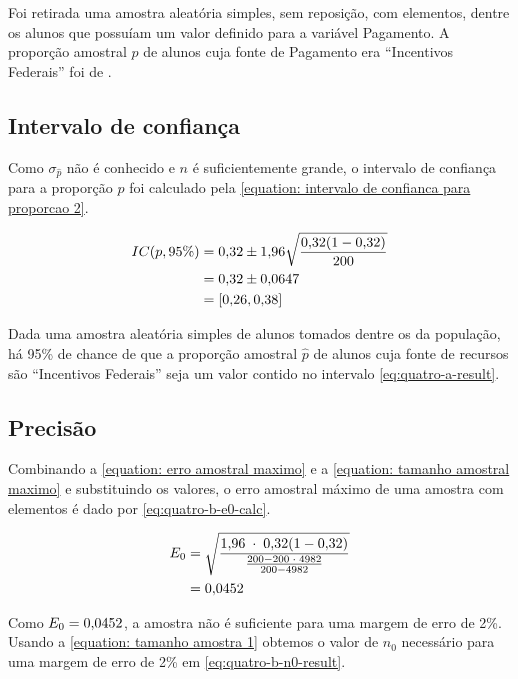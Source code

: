 

	Foi retirada uma amostra aleatória simples, sem reposição, com \QUATROn
	elementos, dentre os \QUATRON alunos que possuíam um valor definido para a
	variável Pagamento. A proporção amostral $\hat{p}$ de alunos cuja fonte de
	Pagamento era ``Incentivos Federais'' foi de \QUATROpAmostral.

\subsection{Intervalo de confiança}

	Como $\sigma_{\hat{p}}$ não é conhecido e $n$ é suficientemente grande,
	o intervalo de confiança para a proporção $p$ foi calculado pela
	\autoref{equation: intervalo de confianca para proporcao 2}.

	\begin{align} 
		IC(p, 95\%) &= \num{0.32} \pm \num{1.96} \sqrt{\frac{\num{0.32} (1- \num{0.32})}{200}} \nonumber \\
					&= \num{0.32} \pm \num{0.0647} \nonumber \\
					\label{eq:quatro-a-result}
					&= [\num{0.26}, \num{0.38}]
	\end{align}

	Dada uma amostra aleatória simples de \QUATROn alunos tomados dentre os
	\QUATRON da população, há 95\% de chance de que a proporção amostral $\hat{p}$ 
    de alunos cuja fonte de recursos são ``Incentivos Federais'' seja um valor 
    contido no intervalo \eqref{eq:quatro-a-result}.

\subsection{Precisão}

	Combinando a \autoref{equation: erro amostral maximo} e a \autoref{equation: tamanho amostral maximo} e
	substituindo os valores, o erro amostral máximo de uma amostra com
	\QUATROn elementos é dado por \eqref{eq:quatro-b-e0-calc}.

	\begin{align}
		E_0 &= \label{eq:quatro-b-e0-calc}
               \sqrt{\frac{\num{1.96} \;\cdot\; \num{0.32} (1 - \num{0.32}) }{\frac{200 - 200 \;\cdot\; 4982}{200 - 4982}}}  \\
			&= \num{0.0452} \nonumber
	\end{align}

	Como $E_0 = \num{0.0452}$, a amostra não é suficiente para uma margem de
	erro de 2\%. Usando a \autoref{equation: tamanho amostra 1} obtemos o valor de $n_0$ 
    necessário para uma margem de erro de 2\% em \eqref{eq:quatro-b-n0-result}.


